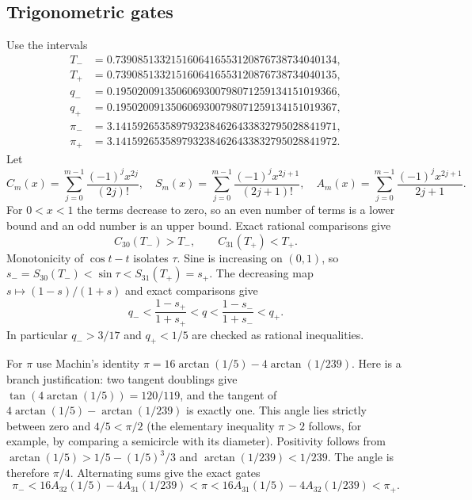\documentclass[review,supplement,hidelinks,onefignum,onetabnum]{siamart251216}
\begin{document}
\subsection{Trigonometric gates}
Use the intervals
\begin{align*}
T_-&=0.7390851332151606416553120876738734040134,\\
T_+&=0.7390851332151606416553120876738734040135,\\
q_-&=0.1950200913506069300798071259134151019366,\\
q_+&=0.1950200913506069300798071259134151019367,\\
\pi_-&=3.1415926535897932384626433832795028841971,\\
\pi_+&=3.1415926535897932384626433832795028841972.
\end{align*}
Let
\[
C_m(x)=\sum_{j=0}^{m-1}\frac{(-1)^jx^{2j}}{(2j)!},\quad
S_m(x)=\sum_{j=0}^{m-1}\frac{(-1)^jx^{2j+1}}{(2j+1)!},\quad
A_m(x)=\sum_{j=0}^{m-1}\frac{(-1)^jx^{2j+1}}{2j+1}.
\]
For $0<x<1$ the terms decrease to zero, so an even number of terms
is a lower bound and an odd number is an upper bound. Exact rational
comparisons give
\[
C_{30}(T_-)>T_-,\qquad C_{31}(T_+)<T_+.
\]
Monotonicity of $\cos t-t$ isolates $\tau$. Sine is increasing on
$(0,1)$, so $s_-=S_{30}(T_-)<\sin\tau<S_{31}(T_+)=s_+$.
The decreasing map $s\mapsto(1-s)/(1+s)$ and exact comparisons give
\[
q_-<\frac{1-s_+}{1+s_+}<q<\frac{1-s_-}{1+s_-}<q_+.
\]
In particular $q_->3/17$ and $q_+<1/5$ are checked as rational
inequalities.

For $\pi$ use Machin's identity
$\pi=16\arctan(1/5)-4\arctan(1/239)$. Here is a branch justification:
two tangent doublings give $\tan(4\arctan(1/5))=120/119$,
and the tangent of $4\arctan(1/5)-\arctan(1/239)$ is exactly one.
This angle lies strictly between zero and $4/5<\pi/2$ (the elementary
inequality $\pi>2$ follows, for example, by comparing a semicircle
with its diameter). Positivity follows from
$\arctan(1/5)>1/5-(1/5)^3/3$ and $\arctan(1/239)<1/239$.
The angle is therefore $\pi/4$. Alternating sums give the exact gates
\[
\pi_-<16A_{32}(1/5)-4A_{31}(1/239)
<\pi<16A_{31}(1/5)-4A_{32}(1/239)<\pi_+.
\]
\end{document}
